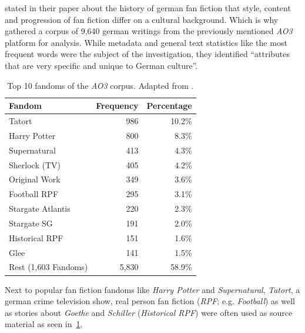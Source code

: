 
\citet{Cuntz-Leng2015AGermany} stated in their paper about the history of german fan fiction that style, content and progression of fan fiction differ on a cultural background.
Which is why \citet{Schmidt2021TowardsOwn} gathered a corpus of 9,640 german writings from the previously mentioned \emph{AO3} platform for analysis.
While metadata and general text statistics like the most frequent words were the subject of the investigation, they identified ``attributes that are very specific and unique to German culture''.
\begin{table}[ht]
    \centering
    \begin{tabular}{lrr}
        \toprule
        \textbf{Fandom} &
        \textbf{Frequency} &
        \textbf{Percentage} \\
        \midrule
        Tatort              & 986   & 10.2\% \\
        Harry Potter        & 800   & 8.3\%  \\
        Supernatural        & 413   & 4.3\%  \\
        Sherlock (TV)       & 405   & 4.2\%  \\
        Original Work       & 349   & 3.6\%  \\
        Football RPF        & 295   & 3.1\%  \\
        Stargate Atlantis   & 220   & 2.3\%  \\
        Stargate SG         & 191   & 2.0\%  \\
        Historical RPF      & 151   & 1.6\%  \\
        Glee                & 141   & 1.5\%  \\
        \midrule
        Rest (1,603 Fandoms) & 5,830 & 58.9\% \\
        \bottomrule
    \end{tabular}
    \caption[Top 10 fandoms of the \emph{AO3} corpus.]{Top 10 fandoms of the \emph{AO3} corpus.
    Adapted from \citet[p.~4]{Schmidt2021TowardsOwn}.}
    \label{tab:schmidt_2021_ao3_corpus}
\end{table}
Next to popular fan fiction fandoms like \emph{Harry Potter} and \emph{Supernatural}, \emph{Tatort}, a german crime television show, real person fan fiction (\emph{RPF}; e.g. \emph{Football}) as well as stories about \emph{Goethe} and \emph{Schiller} (\emph{Historical RPF}) were often used as source material as seen in~\ref{tab:schmidt_2021_ao3_corpus}.
